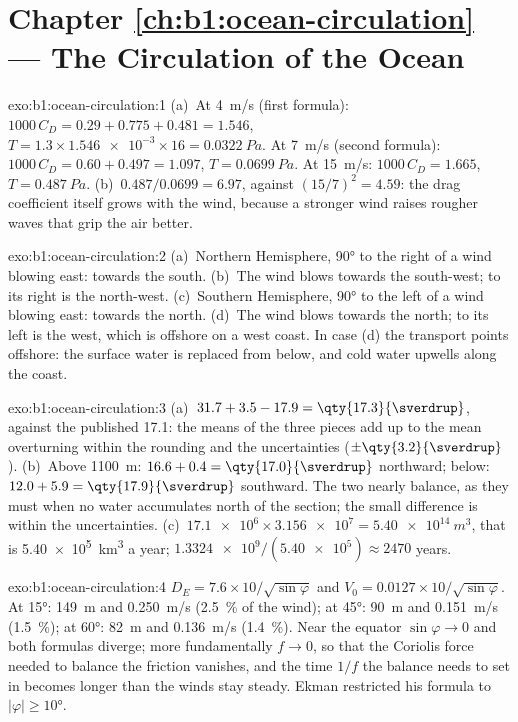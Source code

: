 \section*{Chapter \ref{ch:b1:ocean-circulation} --- The Circulation of the Ocean}

\begin{solution}{exo:b1:ocean-circulation:1}
(a)~At \qty{4}{m/s} (first formula): $1000\,C_D = 0.29 + 0.775 + 0.481 = 1.546$,
$T = 1.3 \times \num{1.546e-3} \times 16 = \qty{0.0322}{Pa}$. At \qty{7}{m/s}
(second formula): $1000\,C_D = 0.60 + 0.497 = 1.097$, $T = \qty{0.0699}{Pa}$. At
\qty{15}{m/s}: $1000\,C_D = 1.665$, $T = \qty{0.487}{Pa}$. (b)~$0.487/0.0699 =
6.97$, against $(15/7)^2 = 4.59$: the drag coefficient itself grows with the wind,
because a stronger wind raises rougher waves that grip the air better.
\end{solution}

\begin{solution}{exo:b1:ocean-circulation:2}
(a)~Northern Hemisphere, \ang{90} to the right of a wind blowing east: towards the
south. (b)~The wind blows towards the south-west; to its right is the north-west.
(c)~Southern Hemisphere, \ang{90} to the left of a wind blowing east: towards the
north. (d)~The wind blows towards the north; to its left is the west, which is
offshore on a west coast. In case (d) the transport points offshore: the surface
water is replaced from below, and cold water upwells along the coast.
\end{solution}

\begin{solution}{exo:b1:ocean-circulation:3}
(a)~$31.7 + 3.5 - 17.9 = \qty{17.3}{\sverdrup}$, against the published
\qty{17.1}{\sverdrup}: the means of the three pieces add up to the mean overturning
within the rounding and the uncertainties ($\pm\qty{3.2}{\sverdrup}$).
(b)~Above \qty{1100}{m}: $16.6 + 0.4 = \qty{17.0}{\sverdrup}$ northward; below:
$12.0 + 5.9 = \qty{17.9}{\sverdrup}$ southward. The two nearly balance, as they must
when no water accumulates north of the section; the small difference is within the
uncertainties. (c)~$\num{17.1e6} \times \num{3.156e7} = \qty{5.40e14}{m^3}$, that is
\qty{5.40e5}{km^3} a year; $\num{1.3324e9}/(\num{5.40e5}) \approx 2470$ years.
\end{solution}

\begin{solution}{exo:b1:ocean-circulation:4}
$D_E = 7.6 \times 10/\sqrt{\sin\varphi}$ and $V_0 = 0.0127 \times
10/\sqrt{\sin\varphi}$. At \ang{15}: \qty{149}{m} and \qty{0.250}{m/s}
(\qty{2.5}{\percent} of the wind); at \ang{45}: \qty{90}{m} and \qty{0.151}{m/s}
(\qty{1.5}{\percent}); at \ang{60}: \qty{82}{m} and \qty{0.136}{m/s}
(\qty{1.4}{\percent}). Near the equator $\sin\varphi \to 0$ and both formulas
diverge; more fundamentally $f \to 0$, so that the Coriolis force needed to balance
the friction vanishes, and the time $1/f$ the balance needs to set in becomes longer
than the winds stay steady. Ekman restricted his formula to $|\varphi| \geq
\ang{10}$.
\end{solution}

